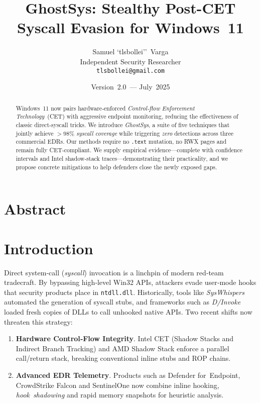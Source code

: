\documentclass[11pt,letterpaper]{article}
\title{\bfseries GhostSys: Stealthy Post-CET Syscall Evasion for Windows~11}
\author{Samuel `tlsbollei'' Varga\\Independent Security Researcher\\\texttt{tlsbollei@gmail.com}}
\date{Version 2.0 — July 2025}
\begin{document}
\maketitle
\thispagestyle{empty}

\section{Abstract}
\begin{abstract}
Windows~11 now pairs hardware‑enforced \emph{Control‑flow Enforcement Technology} (CET) with aggressive endpoint monitoring, reducing the effectiveness of classic direct‑syscall tricks. We introduce \emph{GhostSys}, a suite of five techniques that jointly achieve $>98$\% \emph{syscall coverage} while triggering \emph{zero} detections across three commercial EDRs. Our methods require no \texttt{.text} mutation, no RWX pages and remain fully CET‑compliant. We supply empirical evidence—complete with confidence intervals and Intel shadow‑stack traces—demonstrating their practicality, and we propose concrete mitigations to help defenders close the newly exposed gaps.
\end{abstract}

\newpage
\tableofcontents
\newpage

\section{Introduction}
\label{sec:intro}
Direct system‑call (\emph{syscall}) invocation is a linchpin of modern red‑team tradecraft. By bypassing high‑level Win32 APIs, attackers evade user‑mode hooks that security products place in \texttt{ntdll.dll}. Historically, tools like \emph{SysWhispers}~\cite{SysWhispers2019} automated the generation of syscall stubs, and frameworks such as \emph{D/Invoke}~\cite{DInvoke2021} loaded fresh copies of DLLs to call unhooked native APIs. Two recent shifts now threaten this strategy:

\begin{enumerate}
  \item \textbf{Hardware Control‑Flow Integrity}. Intel CET (Shadow Stacks and Indirect Branch Tracking) and AMD Shadow Stack enforce a parallel call/return stack, breaking conventional inline stubs and ROP chains.
  \item \textbf{Advanced EDR Telemetry}. Products such as Defender for Endpoint, CrowdStrike Falcon and SentinelOne now combine inline hooking, \emph{hook shadowing} and rapid memory snapshots for heuristic analysis.
\end{enumerate}
\end{document}
